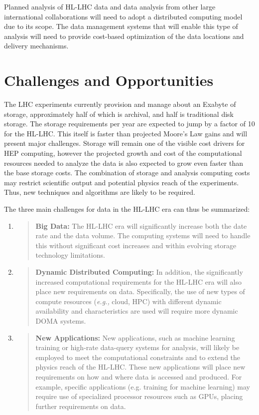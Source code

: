 \documentclass[12pt,a4paper]{article}
\begin{document}
Planned analysis of HL-LHC data and data analysis from other large
international collaborations will need to adopt a distributed computing
model due to its scope. The data management systems that will enable
this type of analysis will need to provide cost-based optimization of
the data locations and delivery mechanisms.

\section{Challenges and
Opportunities}\label{challenges-and-opportunities}

The LHC experiments currently provision and manage about an Exabyte of
storage, approximately half of which is archival, and half is
traditional disk storage. The storage requirements per year are expected
to jump by a factor of 10 for the HL-LHC. This itself is faster than
projected Moore's Law gains and will present major challenges. Storage
will remain one of the visible cost drivers for HEP computing, however
the projected growth and cost of the computational resources needed to
analyze the data is also expected to grow even faster than the base
storage costs. The combination of storage and analysis computing costs
may restrict scientific output and potential physics reach of the
experiments. Thus, new techniques and algorithms are likely to be
required.

The three main challenges for data in the HL-LHC era can thus be
summarized:

\begin{enumerate}
\def\labelenumi{\arabic{enumi}.}
\item
  \begin{quote}
  \textbf{Big Data:} The HL-LHC era will significantly increase both the
  date rate and the data volume. The computing systems will need to
  handle this without significant cost increases and within evolving
  storage technology limitations.
  \end{quote}
\item
  \begin{quote}
  \textbf{Dynamic Distributed Computing:} In addition, the significantly
  increased computational requirements for the HL-LHC era will also
  place new requirements on data. Specifically, the use of new types of
  compute resources (\emph{e.g.,} cloud, HPC) with different dynamic
  availability and characteristics are used will require more dynamic
  DOMA systems.
  \end{quote}
\item
  \begin{quote}
  \textbf{New Applications:} New applications, such as machine learning
  training or high-rate data-query systems for analysis, will likely be
  employed to meet the computational constraints and to extend the
  physics reach of the HL-LHC. These new applications will place new
  requirements on how and where data is accessed and produced. For
  example, specific applications (e.g. training for machine learning)
  may require use of specialized processor resources such as GPUs,
  placing further requirements on data.
  \end{quote}
\end{enumerate}
\end{document}
